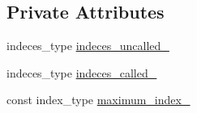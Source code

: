\subsection*{Private Attributes}
\begin{DoxyCompactItemize}
\item 
indeces\-\_\-type \hyperlink{structWonderRabbitProject_1_1bingo_1_1lottery__machine_a20060cafdcdd3bc7685d78258a12f2a7}{indeces\-\_\-uncalled\-\_\-}
\item 
indeces\-\_\-type \hyperlink{structWonderRabbitProject_1_1bingo_1_1lottery__machine_a9614d7348f9dfd37777d860e577f20c1}{indeces\-\_\-called\-\_\-}
\item 
const index\-\_\-type \hyperlink{structWonderRabbitProject_1_1bingo_1_1lottery__machine_a44860cbc8b1fe744522ffdfb9aa8c557}{maximum\-\_\-index\-\_\-}
\end{DoxyCompactItemize}


